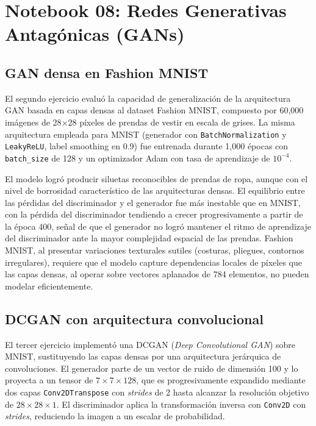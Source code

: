 \documentclass[12pt, a4paper]{article}
\begin{document}
\section{Notebook 08: Redes Generativas Antagónicas (GANs)}

\subsection{GAN densa en Fashion MNIST}

El segundo ejercicio evaluó la capacidad de generalización de la arquitectura GAN basada en capas densas al dataset Fashion MNIST, compuesto por 60,000 imágenes de 28$\times$28 píxeles de prendas de vestir en escala de grises. La misma arquitectura empleada para MNIST (generador con \texttt{BatchNormalization} y \texttt{LeakyReLU}, label smoothing en 0.9) fue entrenada durante 1,000 épocas con \texttt{batch\_size} de 128 y un optimizador Adam con tasa de aprendizaje de $10^{-4}$.

El modelo logró producir siluetas reconocibles de prendas de ropa, aunque con el nivel de borrosidad característico de las arquitecturas densas. El equilibrio entre las pérdidas del discriminador y el generador fue más inestable que en MNIST, con la pérdida del discriminador tendiendo a crecer progresivamente a partir de la época 400, señal de que el generador no logró mantener el ritmo de aprendizaje del discriminador ante la mayor complejidad espacial de las prendas. Fashion MNIST, al presentar variaciones texturales sutiles (costuras, pliegues, contornos irregulares), requiere que el modelo capture dependencias locales de píxeles que las capas densas, al operar sobre vectores aplanados de 784 elementos, no pueden modelar eficientemente.

\subsection{DCGAN con arquitectura convolucional}

El tercer ejercicio implementó una DCGAN (\textit{Deep Convolutional GAN}) sobre MNIST, sustituyendo las capas densas por una arquitectura jerárquica de convoluciones. El generador parte de un vector de ruido de dimensión 100 y lo proyecta a un tensor de $7 \times 7 \times 128$, que es progresivamente expandido mediante dos capas \texttt{Conv2DTranspose} con \textit{strides} de 2 hasta alcanzar la resolución objetivo de $28 \times 28 \times 1$. El discriminador aplica la transformación inversa con \texttt{Conv2D} con \textit{strides}, reduciendo la imagen a un escalar de probabilidad.
\end{document}
